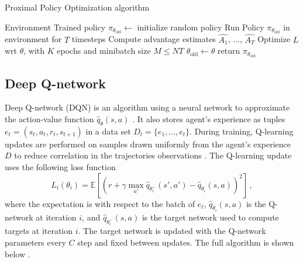 \begin{algorithm}[H]
	\caption{Proximal Policy Optimization algorithm}\label{algorithm:ppo}
	\begin{algorithmic}[1]
	\renewcommand{\algorithmicrequire}{\hspace*{\algorithmicindent}  \textbf{Input:}}
	\renewcommand{\algorithmicensure}{\hspace*{\algorithmicindent}  \textbf{Output:}}
	\Require Environment
	\Ensure Trained policy 
	\State $\pi_{\theta_\text{old}} \gets$ initialize random policy
			\State Run Policy $\pi_{\theta_\text{old}}$ in environment for $T$ timesteps
			\State Compute advantage estimates $\hat{A_1}$, ..., $\hat{A_T}$
		\EndFor
		\State Optimize $L$ wrt $\theta$, with $K$ epochs and minibatch size $M \leq NT$
		\State $\theta_{\text{old}} \gets \theta$
	\EndFor
	\State return $\pi_{\theta_\text{old}}$
\end{algorithmic}
\end{algorithm}

\subsection{Deep Q-network} \label{dqn}

Deep Q-network (DQN) is an algorithm using a neural network to approximate the action-value function $\hat{q}_\theta(s, a)$ \cite{mnih2015human}. It also stores agent's experience as tuples $e_t = (s_t, a_t, r_t, s_{t+1})$ in a data set $D_t = \{e_1, ..., e_t\}$. During training, Q-learning updates are performed on samples drawn uniformly from the agent's experience $D$ to reduce correlation in the trajectories observations \cite{mnih2015human}. The Q-learning update uses the following loss function \cite{mnih2015human}
\begin{equation} \label{equation:2.16}
	L_i(\theta_i) = \mathbb{E} \left [\left ( r + \gamma \max_{a'}\hat{q}_{\theta^-_i}(s',a') -\hat{q}_{\theta_i}(s,a) \right )^2 \right ] \, ,
\end{equation}
where the expectation is with respect to the batch of $e_t$,
$\hat{q}_{\theta_i}(s,a)$ is the Q-network at iteration $i$, and $\hat{q}_{\theta^-_i}(s,a)$ is the target network used to compute targets at iteration $i$. The target network is updated with the Q-network parameters every $C$ step and fixed between updates. The full algorithm is shown below \cite{mnih2015human}.

